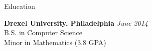 \documentclass{resume} %
\begin{document}

\begin{rSection}{Education}

{\bf Drexel University, Philadelphia} \hfill {\em June 2014} \\ 
B.S. in Computer Science \\
Minor in Mathematics (3.8 GPA) \smallskip \\
\end{rSection}

\end{document}

